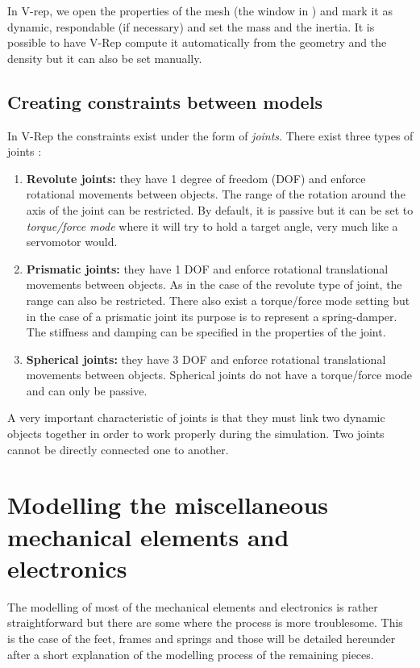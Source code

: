 In V-rep, we open the properties of the mesh (the window in ) and mark it as dynamic, respondable (if necessary) and set the mass and the inertia. It is possible to have V-Rep compute it automatically from the geometry and the density but it can also be set manually.

\subsection{Creating constraints between models \label{sec:joints}}
In V-Rep the constraints exist under the form of \emph{joints}. There exist three types of joints :\begin{enumerate}
\item \textbf{Revolute joints:} they have 1 degree of freedom (DOF) and enforce rotational movements between objects. The range of the rotation around the axis of the joint can be restricted. By default, it is passive but it can be set to \emph{torque/force mode} where it will try to hold a target angle, very much like a servomotor would.
\item \textbf{Prismatic joints:} they have 1 DOF and enforce rotational translational movements between objects. As in the case of the revolute type of joint, the range can also be restricted. There also exist a torque/force mode setting but in the case of a prismatic joint its purpose is to represent a spring-damper. The stiffness and damping can be specified in the properties of the joint.
\item \textbf{Spherical joints:} they have 3 DOF and enforce rotational translational movements between objects. Spherical joints do not have a torque/force mode and can only be passive. 
\end{enumerate}
A very important characteristic of joints is that they must link two dynamic objects together in order to work properly during the simulation. Two joints cannot be directly connected one to another.

\section{Modelling the miscellaneous mechanical elements and electronics}
The modelling of most of the mechanical elements and electronics is rather straightforward but there are some where the process is more troublesome. This is the case of the feet, frames and springs and those will be detailed hereunder after a short explanation of the modelling process of the remaining pieces.

